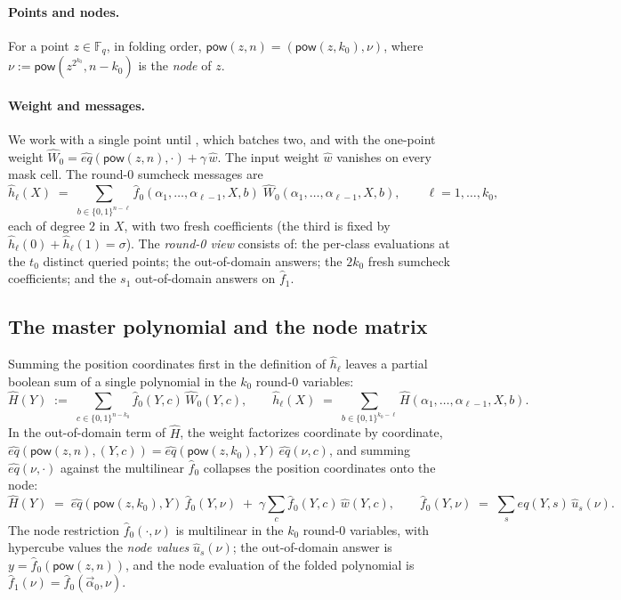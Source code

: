 \documentclass{article}
\newcommand{\Fq}{\mathbb{F}_q}
\newcommand{\pow}{\mathsf{pow}}
\theoremstyle{definition}
\begin{document}
\paragraph{Points and nodes.} For a point $z \in \Fq$, in folding order, $\pow(z, n) = (\pow(z, k_0), \nu)$, where $\nu := \pow(z^{2^{k_0}}, n - k_0)$ is the \emph{node} of $z$.

\paragraph{Weight and messages.} We work with a single point until , which batches two, and with the one-point weight $\hat{W}_0 = \hat{eq}(\pow(z, n), \cdot) + \gamma\, \hat{w}$. The input weight $\hat{w}$ vanishes on every mask cell. The round-0 sumcheck messages are
\[
\hat{h}_\ell(X) \;=\; \sum_{b \in \{0,1\}^{n - \ell}} \hat{f}_0(\alpha_1, \dots, \alpha_{\ell - 1}, X, b)\; \hat{W}_0(\alpha_1, \dots, \alpha_{\ell - 1}, X, b) , \qquad \ell = 1, \dots, k_0 ,
\]
each of degree $2$ in $X$, with two fresh coefficients (the third is fixed by $\hat{h}_\ell(0) + \hat{h}_\ell(1) = \sigma$). The \emph{round-0 view} consists of: the per-class evaluations at the $t_0$ distinct queried points; the out-of-domain answers; the $2k_0$ fresh sumcheck coefficients; and the $s_1$ out-of-domain answers on $\hat{f}_1$.

\subsection{The master polynomial and the node matrix}\label{sec:master}

Summing the position coordinates first in the definition of $\hat{h}_\ell$ leaves a partial boolean sum of a single polynomial in the $k_0$ round-0 variables:
\[
\hat{H}(Y) \;:=\; \sum_{c \in \{0,1\}^{n - k_0}} \hat{f}_0(Y, c)\, \hat{W}_0(Y, c) , \qquad \hat{h}_\ell(X) \;=\; \sum_{b \in \{0,1\}^{k_0 - \ell}} \hat{H}(\alpha_1, \dots, \alpha_{\ell - 1}, X, b) .
\]
In the out-of-domain term of $\hat{H}$, the weight factorizes coordinate by coordinate, $\hat{eq}(\pow(z, n), (Y, c)) = \hat{eq}(\pow(z, k_0), Y)\, \hat{eq}(\nu, c)$, and summing $\hat{eq}(\nu, \cdot)$ against the multilinear $\hat{f}_0$ collapses the position coordinates onto the node:
\begin{equation}\label{eq:master}
\hat{H}(Y) \;=\; \hat{eq}(\pow(z, k_0), Y)\, \hat{f}_0(Y, \nu) \;+\; \gamma \sum_{c} \hat{f}_0(Y, c)\, \hat{w}(Y, c) , \qquad \hat{f}_0(Y, \nu) \;=\; \sum_s \hat{eq}(Y, s)\, \hat{u}_s(\nu) .
\end{equation}
The node restriction $\hat{f}_0(\cdot, \nu)$ is multilinear in the $k_0$ round-0 variables, with hypercube values the \emph{node values} $\hat{u}_s(\nu)$; the out-of-domain answer is $y = \hat{f}_0(\pow(z, n))$, and the node evaluation of the folded polynomial is $\hat{f}_1(\nu) = \hat{f}_0(\vec{\alpha}_0, \nu)$.
\end{document}
